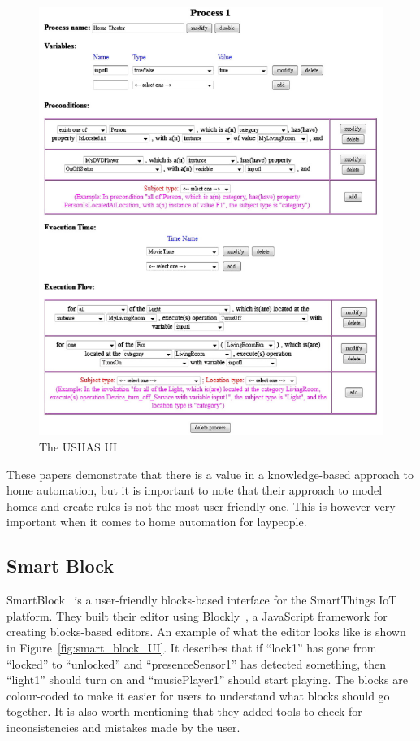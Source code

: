 \documentclass[11pt,a4paper]{report}
\begin{document}
\begin{figure}
    \centering
    \includegraphics[width=0.8\linewidth]{images/USHAS_UI.png}
    \caption{The USHAS UI~\cite{SOTA_AutomationConfigurationSmarthome}}
    \label{fig:USHAS_UI}
\end{figure}

These papers demonstrate that there is a value in a knowledge-based approach to home automation, but it is important to note that their approach to model homes and create rules is not the most user-friendly one. This is however very important when it comes to home automation for laypeople.

\subsection{Smart Block}
\label{SmartBlock}
SmartBlock~\cite{SOTA_SmartBlock} is a user-friendly blocks-based interface for the SmartThings IoT platform. They built their editor using Blockly~\cite{Blockly}, a JavaScript framework for creating blocks-based editors. An example of what the editor looks like is shown in Figure~\ref{fig:smart_block_UI}. It describes that if ``lock1'' has gone from ``locked'' to ``unlocked'' and ``presenceSensor1'' has detected something, then ``light1'' should turn on and ``musicPlayer1'' should start playing. The blocks are colour-coded to make it easier for users to understand what blocks should go together. It is also worth mentioning that they added tools to check for inconsistencies and mistakes made by the user.
\end{document}
